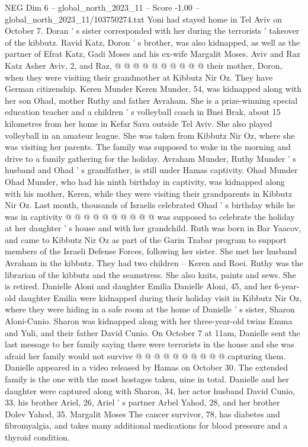 \begin{textsample}{NEG Dim 6 – global\_north\_2023\_11 – Score -1.00 – global\_north\_2023\_11/103750274.txt}
Yoni had stayed home in Tel Aviv on October 7.
Doran ' s sister corresponded with her during the terrorists ' takeover of the kibbutz.
Ravid Katz, Doron ' s brother, was also kidnapped, as well as the partner of Efrat Katz, Gadi Moses and his ex-wife Margalit Moses.
Aviv and Raz Katz Asher Aviv, 2, and Raz, @ @ @ @ @ @ @ @ @ @ their mother, Doron, when they were visiting their grandmother at Kibbutz Nir Oz.
They have German citizenship.
Keren Munder Keren Munder, 54, was kidnapped along with her son Ohad, mother Ruthy and father Avraham.
She is a prize-winning special education teacher and a children ' s volleyball coach in Bnei Brak, about 15 kilometres from her home in Kefar Sava outside Tel Aviv.
She also played volleyball in an amateur league.
She was taken from Kibbutz Nir Oz, where she was visiting her parents.
The family was supposed to wake in the morning and drive to a family gathering for the holiday.
Avraham Munder, Ruthy Munder ' s husband and Ohad ' s grandfather, is still under Hamas captivity.
Ohad Munder Ohad Munder, who had his ninth birthday in captivity, was kidnapped along with his mother, Keren, while they were visiting their grandparents in Kibbutz Nir Oz.
Last month, thousands of Israelis celebrated Ohad ' s birthday while he was in captivity @ @ @ @ @ @ @ @ @ @ was supposed to celebrate the holiday at her daughter ' s house and with her grandchild.
Ruth was born in Bar Yaacov, and came to Kibbutz Nir Oz as part of the Garin Tzabar program to support members of the Israeli Defense Forces, following her sister.
She met her husband Avraham in the kibbutz.
They had two children -- Keren and Roei.
Ruthy was the librarian of the kibbutz and the seamstress.
She also knits, paints and sews.
She is retired.
Danielle Aloni and daughter Emilia Danielle Aloni, 45, and her 6-year-old daughter Emilia were kidnapped during their holiday visit in Kibbutz Nir Oz, where they were hiding in a safe room at the home of Danielle ' s sister, Sharon Aloni-Cunio.
Sharon was kidnapped along with her three-year-old twins Emma and Yuli, and their father David Cunio.
On October 7 at 11am, Danielle sent the last message to her family saying there were terrorists in the house and she was afraid her family would not survive @ @ @ @ @ @ @ @ @ @ capturing them.
Danielle appeared in a video released by Hamas on October 30.
The extended family is the one with the most hostages taken, nine in total.
Danielle and her daughter were captured along with Sharon, 34, her actor husband David Cunio, 33, his brother Ariel, 26, Ariel ' s partner Arbel Yahod, 28, and her brother Dolev Yahod, 35.
Margalit Moses The cancer survivor, 78, has diabetes and fibromyalgia, and takes many additional medications for blood pressure and a thyroid condition.

\end{textsample}
